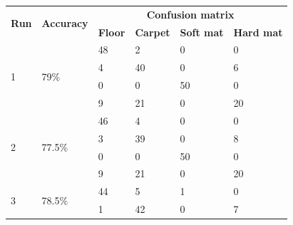 \documentclass[USenglish]{ifimaster}  %
\begin{document}
\begin{table}[h]\ContinuedFloat
	\begin{subtable}[h]{1\textwidth} 
		\centering
		\captionsetup{justification=centering}
		\begin{tabular}{@{}llllll@{}}
			\toprule
			\multirow{2}{*}{\textbf{Run}} & \multirow{2}{*}{\textbf{Accuracy}} & \multicolumn{4}{c}{\textbf{Confusion matrix}} \\ \cmidrule(l){3-6} 
			&  & \multicolumn{1}{l|}{\textbf{Floor}} & \multicolumn{1}{l|}{\textbf{Carpet}} & \multicolumn{1}{l|}{\textbf{Soft mat}} & \textbf{Hard mat} \\ \midrule
			\multicolumn{1}{l|}{\multirow{4}{*}{1}} & \multicolumn{1}{l|}{\multirow{4}{*}{79\%}} & \multicolumn{1}{l|}{48} & \multicolumn{1}{l|}{2} & \multicolumn{1}{l|}{0} & 0 \\ \cmidrule(l){3-6} 
			\multicolumn{1}{l|}{} & \multicolumn{1}{l|}{} & \multicolumn{1}{l|}{4} & \multicolumn{1}{l|}{40} & \multicolumn{1}{l|}{0} & 6 \\ \cmidrule(l){3-6} 
			\multicolumn{1}{l|}{} & \multicolumn{1}{l|}{} & \multicolumn{1}{l|}{0} & \multicolumn{1}{l|}{0} & \multicolumn{1}{l|}{50} & 0 \\ \cmidrule(l){3-6} 
			\multicolumn{1}{l|}{} & \multicolumn{1}{l|}{} & \multicolumn{1}{l|}{9} & \multicolumn{1}{l|}{21} & \multicolumn{1}{l|}{0} & 20 \\ \midrule
			\multicolumn{1}{l|}{\multirow{4}{*}{2}} & \multicolumn{1}{l|}{\multirow{4}{*}{77.5\%}} & \multicolumn{1}{l|}{46} & \multicolumn{1}{l|}{4} & \multicolumn{1}{l|}{0} & 0 \\ \cmidrule(l){3-6} 
			\multicolumn{1}{l|}{} & \multicolumn{1}{l|}{} & \multicolumn{1}{l|}{3} & \multicolumn{1}{l|}{39} & \multicolumn{1}{l|}{0} & 8 \\ \cmidrule(l){3-6} 
			\multicolumn{1}{l|}{} & \multicolumn{1}{l|}{} & \multicolumn{1}{l|}{0} & \multicolumn{1}{l|}{0} & \multicolumn{1}{l|}{50} & 0 \\ \cmidrule(l){3-6} 
			\multicolumn{1}{l|}{} & \multicolumn{1}{l|}{} & \multicolumn{1}{l|}{9} & \multicolumn{1}{l|}{21} & \multicolumn{1}{l|}{0} & 20 \\ \midrule
			\multicolumn{1}{l|}{\multirow{4}{*}{3}} & \multicolumn{1}{l|}{\multirow{4}{*}{78.5\%}} & \multicolumn{1}{l|}{44} & \multicolumn{1}{l|}{5} & \multicolumn{1}{l|}{1} & 0 \\ \cmidrule(l){3-6} 
			\multicolumn{1}{l|}{} & \multicolumn{1}{l|}{} & \multicolumn{1}{l|}{1} & \multicolumn{1}{l|}{42} & \multicolumn{1}{l|}{0} & 7 \\ \cmidrule(l){3-6} 

\end{tabular}
\end{subtable}
\end{table}
\end{document}

